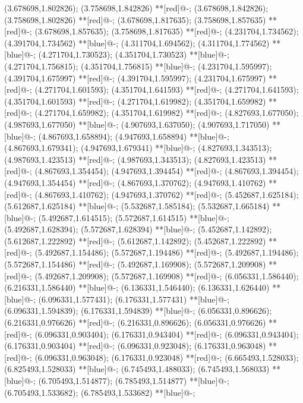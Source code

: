 (3.678698,1.802826); (3.758698,1.842826) **[red]@{-};
(3.678698,1.842826); (3.758698,1.802826) **[red]@{-};
(3.678698,1.817635); (3.758698,1.857635) **[red]@{-};
(3.678698,1.857635); (3.758698,1.817635) **[red]@{-};
(4.231704,1.734562); (4.391704,1.734562) **[blue]@{-};
(4.311704,1.694562); (4.311704,1.774562) **[blue]@{-};
(4.271704,1.730523); (4.351704,1.730523) **[blue]@{-};
(4.271704,1.756815); (4.351704,1.756815) **[blue]@{-};
(4.231704,1.595997); (4.391704,1.675997) **[red]@{-};
(4.391704,1.595997); (4.231704,1.675997) **[red]@{-};
(4.271704,1.601593); (4.351704,1.641593) **[red]@{-};
(4.271704,1.641593); (4.351704,1.601593) **[red]@{-};
(4.271704,1.619982); (4.351704,1.659982) **[red]@{-};
(4.271704,1.659982); (4.351704,1.619982) **[red]@{-};
(4.827693,1.677050); (4.987693,1.677050) **[blue]@{-};
(4.907693,1.637050); (4.907693,1.717050) **[blue]@{-};
(4.867693,1.658894); (4.947693,1.658894) **[blue]@{-};
(4.867693,1.679341); (4.947693,1.679341) **[blue]@{-};
(4.827693,1.343513); (4.987693,1.423513) **[red]@{-};
(4.987693,1.343513); (4.827693,1.423513) **[red]@{-};
(4.867693,1.354454); (4.947693,1.394454) **[red]@{-};
(4.867693,1.394454); (4.947693,1.354454) **[red]@{-};
(4.867693,1.370762); (4.947693,1.410762) **[red]@{-};
(4.867693,1.410762); (4.947693,1.370762) **[red]@{-};
(5.452687,1.625184); (5.612687,1.625184) **[blue]@{-};
(5.532687,1.585184); (5.532687,1.665184) **[blue]@{-};
(5.492687,1.614515); (5.572687,1.614515) **[blue]@{-};
(5.492687,1.628394); (5.572687,1.628394) **[blue]@{-};
(5.452687,1.142892); (5.612687,1.222892) **[red]@{-};
(5.612687,1.142892); (5.452687,1.222892) **[red]@{-};
(5.492687,1.154486); (5.572687,1.194486) **[red]@{-};
(5.492687,1.194486); (5.572687,1.154486) **[red]@{-};
(5.492687,1.169908); (5.572687,1.209908) **[red]@{-};
(5.492687,1.209908); (5.572687,1.169908) **[red]@{-};
(6.056331,1.586440); (6.216331,1.586440) **[blue]@{-};
(6.136331,1.546440); (6.136331,1.626440) **[blue]@{-};
(6.096331,1.577431); (6.176331,1.577431) **[blue]@{-};
(6.096331,1.594839); (6.176331,1.594839) **[blue]@{-};
(6.056331,0.896626); (6.216331,0.976626) **[red]@{-};
(6.216331,0.896626); (6.056331,0.976626) **[red]@{-};
(6.096331,0.903404); (6.176331,0.943404) **[red]@{-};
(6.096331,0.943404); (6.176331,0.903404) **[red]@{-};
(6.096331,0.923048); (6.176331,0.963048) **[red]@{-};
(6.096331,0.963048); (6.176331,0.923048) **[red]@{-};
(6.665493,1.528033); (6.825493,1.528033) **[blue]@{-};
(6.745493,1.488033); (6.745493,1.568033) **[blue]@{-};
(6.705493,1.514877); (6.785493,1.514877) **[blue]@{-};
(6.705493,1.533682); (6.785493,1.533682) **[blue]@{-};
